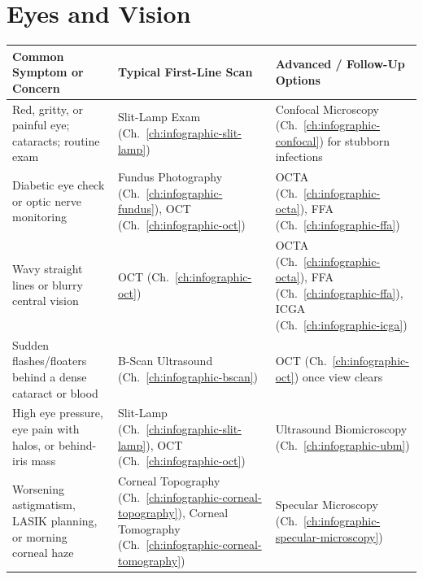 \section{Eyes and Vision}
{\renewcommand{\arraystretch}{1.25}\noindent
\begin{tabularx}{\textwidth}{@{}p{} p{} X@{}}
\toprule
\textbf{Common Symptom or Concern} & \textbf{Typical First-Line Scan} & \textbf{Advanced / Follow-Up Options} \\
\midrule
Red, gritty, or painful eye; cataracts; routine exam & Slit-Lamp Exam (Ch.~\ref{ch:infographic-slit-lamp}) & Confocal Microscopy (Ch.~\ref{ch:infographic-confocal}) for stubborn infections \\
Diabetic eye check or optic nerve monitoring & Fundus Photography (Ch.~\ref{ch:infographic-fundus}), OCT (Ch.~\ref{ch:infographic-oct}) & OCTA (Ch.~\ref{ch:infographic-octa}), FFA (Ch.~\ref{ch:infographic-ffa}) \\
Wavy straight lines or blurry central vision & OCT (Ch.~\ref{ch:infographic-oct}) & OCTA (Ch.~\ref{ch:infographic-octa}), FFA (Ch.~\ref{ch:infographic-ffa}), ICGA (Ch.~\ref{ch:infographic-icga}) \\
Sudden flashes/floaters behind a dense cataract or blood & B-Scan Ultrasound (Ch.~\ref{ch:infographic-bscan}) & OCT (Ch.~\ref{ch:infographic-oct}) once view clears \\
High eye pressure, eye pain with halos, or behind-iris mass & Slit-Lamp (Ch.~\ref{ch:infographic-slit-lamp}), OCT (Ch.~\ref{ch:infographic-oct}) & Ultrasound Biomicroscopy (Ch.~\ref{ch:infographic-ubm}) \\
Worsening astigmatism, LASIK planning, or morning corneal haze & Corneal Topography (Ch.~\ref{ch:infographic-corneal-topography}), Corneal Tomography (Ch.~\ref{ch:infographic-corneal-tomography}) & Specular Microscopy (Ch.~\ref{ch:infographic-specular-microscopy}) \\
\bottomrule
\end{tabularx}}

